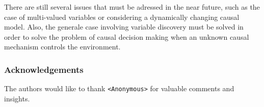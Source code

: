 \documentclass[letterpaper]{article}
\begin{document}
There are still several issues that must be adressed in the near future, such as the case of multi-valued variables or considering a dynamically changing causal model. Also, the generale case involving variable discovery must be solved in order to solve the problem of causal decision making when an unknown causal mechanism controls the environment. 

\newpage
\subsubsection*{Acknowledgements}
The authors would like to thank \texttt{<Anonymous>} for valuable comments and insights. 



\end{document}
